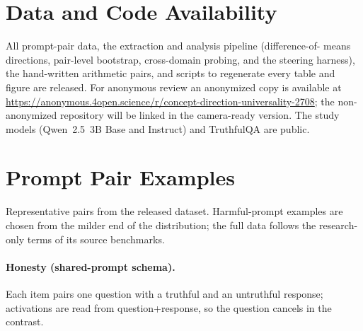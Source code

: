 \documentclass[11pt]{article}
\begin{document}
\section*{Data and Code Availability}

All prompt-pair data, the extraction and analysis pipeline (difference-of-
means directions, pair-level bootstrap, cross-domain probing, and the
steering harness), the hand-written arithmetic pairs, and scripts to
regenerate every table and figure are released. For anonymous review an
anonymized copy is available at
\url{https://anonymous.4open.science/r/concept-direction-universality-2708}; the
non-anonymized repository will be linked in the camera-ready version. The
study models (Qwen~2.5~3B Base and Instruct) and TruthfulQA are public.






\appendix

\section{Prompt Pair Examples}
\label{app:prompts}

Representative pairs from the released dataset. Harmful-prompt examples are
chosen from the milder end of the distribution; the full data follows the
research-only terms of its source benchmarks.

\paragraph{Honesty (shared-prompt schema).}
Each item pairs one question with a truthful and an untruthful response;
activations are read from question{+}response, so the question cancels in
the contrast.
\end{document}
